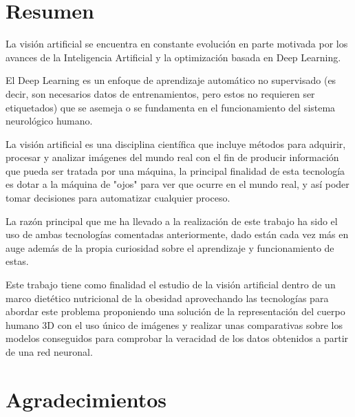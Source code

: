 
\chapter*{Resumen}
\thispagestyle{empty}
La visión artificial se encuentra en constante evolución en parte motivada por los avances de la Inteligencia Artificial y la optimización basada en Deep Learning. 

El Deep Learning es un enfoque de aprendizaje automático no supervisado (es decir, son necesarios datos de entrenamientos, pero estos no requieren ser etiquetados) que se asemeja o se fundamenta en el funcionamiento del sistema neurológico humano.

La visión artificial es una disciplina científica que incluye métodos para adquirir, procesar y analizar imágenes del mundo real con el fin de producir información que pueda ser tratada por una máquina, la principal finalidad de esta tecnología es dotar a la máquina de "ojos" para ver que ocurre en el mundo real, y así poder tomar decisiones para automatizar cualquier proceso.

La razón principal que me ha llevado a la realización de este trabajo ha sido el uso de ambas tecnologías comentadas anteriormente, dado están cada vez más en auge además de la propia curiosidad sobre el aprendizaje y funcionamiento de estas.

Este trabajo tiene como finalidad el estudio de la visión artificial dentro de un marco dietético nutricional de la obesidad aprovechando las tecnologías para abordar este problema proponiendo una solución de la representación del cuerpo humano 3D con el uso único de imágenes y realizar unas comparativas sobre los modelos conseguidos para comprobar la veracidad de los datos obtenidos a partir de una red neuronal.



\cleardoublepage %
\chapter*{Agradecimientos
}

\thispagestyle{empty}
\vspace{1cm}

